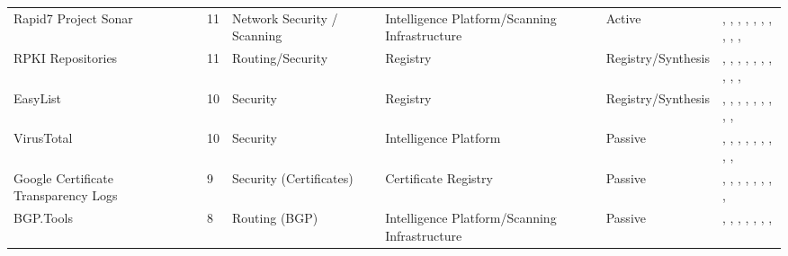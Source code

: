 \documentclass[11pt,a4paper]{article}
\begin{document}
\begin{longtable}{@{}p{}p{}p{}p{}p{}p{}p{}@{}}
Rapid7 Project Sonar & \cite{rapid7_sonar} & 11 & Network Security / Scanning & Intelligence Platform/Scanning Infrastructure & Active & \cite{10.1145/3517745.3561424}, \cite{10.1145/3487552.3487833}, \cite{10.1007/978-3-030-98785-5_3}, \cite{10.1007/978-3-031-28486-1_4}, \cite{10.1145/3646547.3688449}, \cite{10.1007/978-3-030-72582-2_17}, \cite{10.1007/978-3-031-85960-1_3}, \cite{10.1145/3517745.3561443}, \cite{10.1007/978-3-031-56252-5_4}, \cite{10.1007/978-3-031-28486-1_21}, \cite{10.1145/3777912.3839791} \\
RPKI Repositories & \cite{riperpkiarchive} & 11 & Routing/Security & Registry & Registry/Synthesis & \cite{10.1145/3730567.3732917}, \cite{10.1145/3646547.3688444}, \cite{10.1145/3618257.3624819}, \cite{10.1145/3618257.3624817}, \cite{10.1145/3517745.3561419}, \cite{10.1145/3517745.3561454}, \cite{10.1007/978-3-030-98785-5_14}, \cite{10.1007/978-3-031-28486-1_18}, \cite{10.1007/978-3-031-56252-5_5}, \cite{10.1007/978-3-032-18268-5_2}, \cite{10.1145/3777912.3839812} \\
EasyList & \cite{easylist} & 10 & Security & Registry & Registry/Synthesis & \cite{10.1145/3730567.3764427}, \cite{10.1145/3618257.3624823}, \cite{10.1145/3517745.3561460}, \cite{10.1145/3487552.3487850}, \cite{10.1145/3487552.3487855}, \cite{10.1007/978-3-030-72582-2_7}, \cite{10.1145/3777912.3839788}, \cite{10.1145/3777912.3839794}, \cite{10.1145/3777912.3839818}, \cite{10.1145/3777912.3839794} \\
VirusTotal & \cite{virustotal} & 10 & Security & Intelligence Platform & Passive & \cite{10.1145/3618257.3624812}, \cite{10.1145/3618257.3624800}, \cite{10.1145/3618257.3624839}, \cite{10.1145/3517745.3561463}, \cite{10.1145/3487552.3487833}, \cite{10.1007/978-3-030-72582-2_3}, \cite{10.1007/978-3-031-56249-5_6}, \cite{10.1145/3777912.3809148}, \cite{10.1145/3777912.3839787}, \cite{10.1145/3777912.3809151} \\
Google Certificate Transparency Logs & \cite{googlectlogs} & 9 & Security (Certificates) & Certificate Registry & Passive & \cite{10.1145/3646547.3689017}, \cite{10.1145/3618257.3624835}, \cite{10.1145/3618257.3624797}, \cite{10.1007/978-3-030-72582-2_10}, \cite{10.1145/3618257.3624802}, \cite{10.1007/978-3-031-28486-1_4}, \cite{10.1007/978-3-031-56249-5_9}, \cite{10.1007/978-3-031-56249-5_10}, \cite{10.1145/3777912.3809157} \\
BGP.Tools & \cite{bgptools} & 8 & Routing (BGP) & Intelligence Platform/Scanning Infrastructure & Passive & \cite{10.1145/3646547.3688444}, \cite{10.1007/978-3-031-28486-1_15}, \cite{10.1007/978-3-031-28486-1_21}, \cite{10.1007/978-3-032-18268-5_2}, \cite{10.1145/3777912.3839828}, \cite{10.1145/3777912.3839800}, \cite{10.1145/3777912.3839785}, \cite{10.1145/3777912.3839812} \\

\end{longtable}
\end{document}
